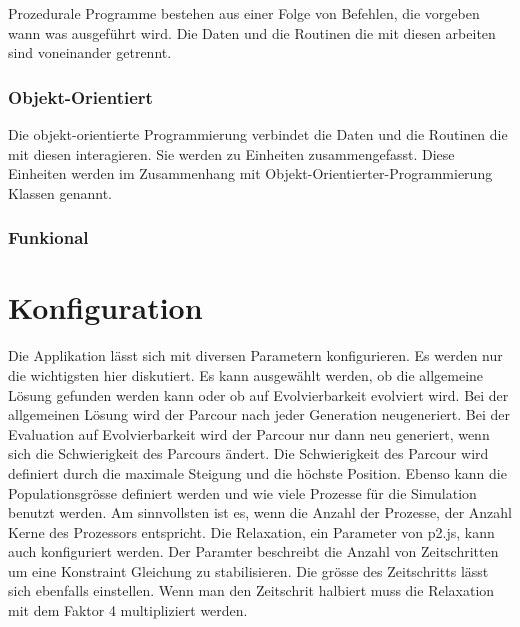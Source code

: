         Prozedurale Programme bestehen aus einer Folge von Befehlen,
        die vorgeben wann was ausgeführt wird.
        Die Daten und die Routinen die mit diesen arbeiten sind voneinander getrennt.

      \subsubsection{Objekt-Orientiert\label{subsub:TechnologyParadigmaObjectOriented}}

        Die objekt-orientierte Programmierung verbindet die Daten und
        die Routinen die mit diesen interagieren. Sie werden zu Einheiten zusammengefasst.
        Diese Einheiten werden im Zusammenhang mit Objekt-Orientierter-Programmierung Klassen genannt.

      \subsubsection{Funkional\label{subsub:TechnologyParadigmaFunctional}}


  \section{Konfiguration}
  \label{sec:Konfiguration}
    Die Applikation lässt sich mit diversen Parametern konfigurieren.
    Es werden nur die wichtigsten hier diskutiert.
    Es kann ausgewählt werden, ob die allgemeine Lösung gefunden werden kann oder
    ob auf Evolvierbarkeit evolviert wird. Bei der allgemeinen Lösung wird der Parcour
    nach jeder Generation neugeneriert. Bei der Evaluation auf Evolvierbarkeit
    wird der Parcour nur dann neu generiert, wenn sich die Schwierigkeit des Parcours ändert.
    Die Schwierigkeit des Parcour wird definiert durch die maximale Steigung und die höchste Position.
    Ebenso kann die Populationsgrösse definiert werden und wie viele Prozesse für die Simulation benutzt werden.
    Am sinnvollsten ist es, wenn die Anzahl der Prozesse, der Anzahl Kerne des Prozessors entspricht.
    Die Relaxation, ein Parameter von p2.js, kann auch konfiguriert werden.
    Der Paramter beschreibt die Anzahl von Zeitschritten um eine Konstraint Gleichung zu stabilisieren.
    Die grösse des Zeitschritts lässt sich ebenfalls einstellen. Wenn man den Zeitschrit halbiert muss die Relaxation mit dem
    Faktor 4 multipliziert werden.




